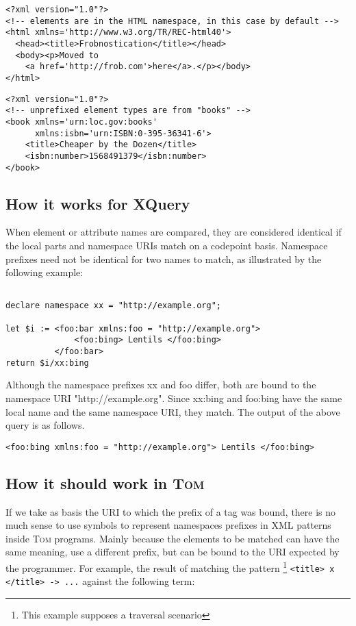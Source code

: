 \documentclass{article}
\newcommand{\tom}{\textsc{Tom} }
\begin{document}
\begin{verbatim}
<?xml version="1.0"?>
<!-- elements are in the HTML namespace, in this case by default -->
<html xmlns='http://www.w3.org/TR/REC-html40'>
  <head><title>Frobnostication</title></head>
  <body><p>Moved to 
    <a href='http://frob.com'>here</a>.</p></body>
</html>
\end{verbatim}

\begin{verbatim}
<?xml version="1.0"?>
<!-- unprefixed element types are from "books" -->
<book xmlns='urn:loc.gov:books'
      xmlns:isbn='urn:ISBN:0-395-36341-6'>
    <title>Cheaper by the Dozen</title>
    <isbn:number>1568491379</isbn:number>
</book>
\end{verbatim}


\subsection{How it works for XQuery}

When element or attribute names are compared, they are considered identical if the local parts and namespace URIs match on a codepoint basis. Namespace prefixes need not be identical for two names to match, as illustrated by the following example:

\begin{verbatim}

declare namespace xx = "http://example.org";

let $i := <foo:bar xmlns:foo = "http://example.org">
              <foo:bing> Lentils </foo:bing>
          </foo:bar>
return $i/xx:bing
\end{verbatim}

Although the namespace prefixes xx and foo differ, both are bound to the namespace URI "http://example.org". Since xx:bing and foo:bing have the same local name and the same namespace URI, they match. The output of the above query is as follows.

\verb$<foo:bing xmlns:foo = "http://example.org"> Lentils </foo:bing>$

\subsection{How it should work in \tom}

If we take as basis the URI to which the prefix of a tag was bound, there is no much sense to use symbols to represent namespaces prefixes in XML patterns inside \tom programs. Mainly because the elements to be matched can have the same meaning, use a different prefix, but can be bound to the URI expected by the programmer. For example, the result of matching the  pattern \footnote{This example supposes a traversal scenario}  \verb$<title> x </title> -> ...$ against the following term:
\end{document}
